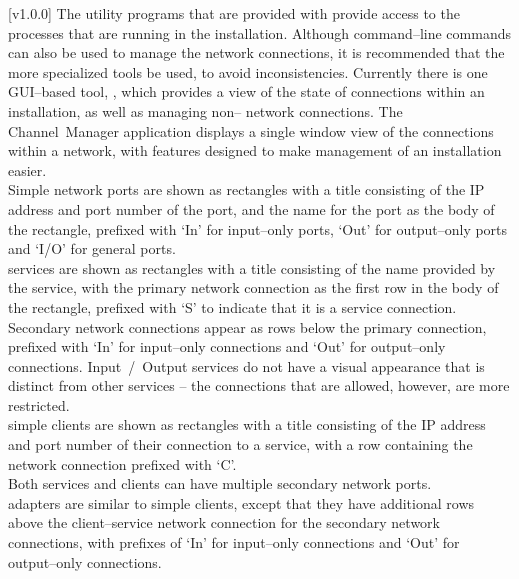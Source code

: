[v1.0.0]
The utility programs that are provided with \mplusm{} provide access to the processes that
are running in the \mplusm{} installation.
Although command--line \yarp{} commands can also be used to manage the network
connections, it is recommended that the more specialized \mplusm{} tools be used, to avoid
inconsistencies.
Currently there is one GUI--based tool, ,
which provides a view of the state of connections within an \mplusm{} installation, as
well as managing non--\mplusm{} \yarp{} network connections.
The Channel~Manager application displays a single window view of the connections within a
\yarp{} network, with features designed to make management of an \mplusm{} installation
easier.\\

Simple \yarp{} network ports are shown as rectangles with a title consisting of the IP
address and port number of the port, and the \yarp{} name for the port as the body of the
rectangle, prefixed with `In' for input--only ports, `Out' for output--only ports and
`I/O' for general ports.\\

\mplusm{} services are shown as rectangles with a title consisting of the name provided by
the service, with the primary \yarp{} network connection as the first row in the body of
the rectangle, prefixed with `S' to indicate that it is a service connection.
Secondary \yarp{} network connections appear as rows below the primary connection,
prefixed with `In' for input--only connections and `Out' for output--only connections.
\mplusm{} Input~/~Output services do not have a visual appearance that is distinct from
other \mplusm{} services -- the connections that are allowed, however, are more
restricted.\\

\mplusm{} simple clients are shown as rectangles with a title consisting of the IP address
and port number of their connection to a service, with a row containing the \yarp{}
network connection prefixed with `C'.\\

Both \mplusm{} services and clients can have multiple secondary \yarp{} network ports.\\

\mplusm{} adapters are similar to \mplusm{} simple clients, except that they have
additional rows above the client--service \yarp{} network connection for the secondary
\yarp{} network connections, with prefixes of `In' for input--only connections and `Out'
for output--only connections.\\

